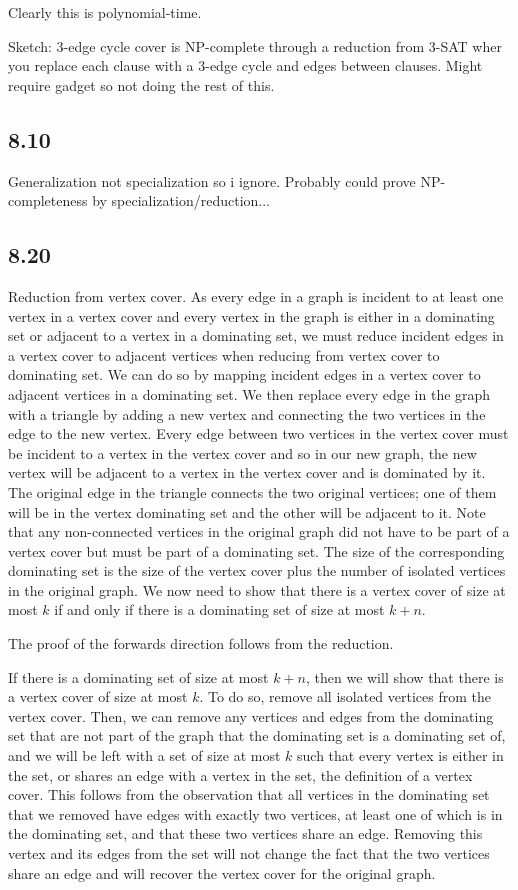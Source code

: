 \documentclass[11pt]{article}
\begin{document}
Clearly this is polynomial-time.

Sketch: 3-edge cycle cover is NP-complete through a reduction from 3-SAT wher you replace each clause with a 3-edge cycle and edges between clauses. Might require gadget so not doing the rest of this.

\subsection{8.10}

Generalization not specialization so i ignore. Probably could prove NP-completeness by specialization/reduction...

\subsection{8.20}

Reduction from vertex cover. As every edge in a graph is incident to at least one vertex in a vertex cover and every vertex in the graph is either in a dominating set or adjacent to a vertex in a dominating set, we must reduce incident edges in a vertex cover to adjacent vertices when reducing from vertex cover to dominating set. We can do so by mapping incident edges in a vertex cover to adjacent vertices in a dominating set. We then replace every edge in the graph with a triangle by adding a new vertex and connecting the two vertices in the edge to the new vertex. Every edge between two vertices in the vertex cover must be incident to a vertex in the vertex cover and so in our new graph, the new vertex will be adjacent to a vertex in the vertex cover and is dominated by it. The original edge in the triangle connects the two original vertices; one of them will be in the vertex dominating set and the other will be adjacent to it. Note that any non-connected vertices in the original graph did not have to be part of a vertex cover but must be part of a dominating set. The size of the corresponding dominating set is the size of the vertex cover plus the number of isolated vertices in the original graph. We now need to show that there is a vertex cover of size at most $k$ if and only if there is a dominating set of size at most $k + n$.

The proof of the forwards direction follows from the reduction.

If there is a dominating set of size at most $k + n$, then we will show that there is a vertex cover of size at most $k$. To do so, remove all isolated vertices from the vertex cover. Then, we can remove any vertices and edges from the dominating set that are not part of the graph that the dominating set is a dominating set of, and we will be left with a set of size at most $k$ such that every vertex is either in the set, or shares an edge with a vertex in the set, the definition of a vertex cover. This follows from the observation that all vertices in the dominating set that we removed have edges with exactly two vertices, at least one of which is in the dominating set, and that these two vertices share an edge. Removing this vertex and its edges from the set will not change the fact that the two vertices share an edge and will recover the vertex cover for the original graph.
\end{document}
